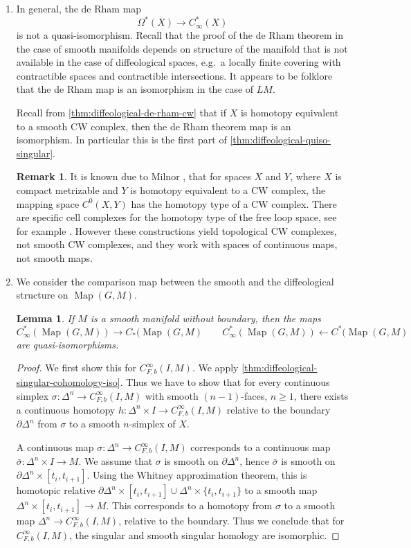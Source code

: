 \documentclass{scrartcl}
\theoremstyle{plain}
\newtheorem{lemma}[theorem]{Lemma}
\theoremstyle{definition}
\newtheorem{remark}[theorem]{Remark}
\newcommand{\from}{\leftarrow}
\DeclareMathOperator{\Map}{Map}
\begin{document}
\begin{enumerate}[(1)]
    \item In general, the de Rham map $$\Omega^*(X) \to C_\infty^*(X)$$ is not a quasi-isomorphism. Recall that the proof of the de Rham theorem in the case of smooth manifolds depends on structure of the manifold that is not available in the case of diffeological spaces, e.g.\ a locally finite covering with contractible spaces and contractible intersections. It appears to be folklore that the de Rham map is an isomorphism in the case of $LM$. 

Recall from \cref{thm:diffeological-de-rham-cw} that if $X$ is homotopy equivalent to a smooth CW complex, then the de Rham theorem map is an isomorphism. In particular this is the first part of \cref{thm:diffeological-quiso-singular}.

\begin{remark}
    It is known due to Milnor \cite{milnor1959spaces}, that for spaces $X$ and $Y$, where $X$ is compact metrizable and $Y$ is homotopy equivalent to a CW complex, the mapping space $C^0(X, Y)$ has the homotopy type of a CW complex. There are specific cell complexes for the homotopy type of the free loop space, see for example \cite{rivera2018combinatorial}. However these constructions yield topological CW complexes, not smooth CW complexes, and they work with spaces of continuous maps, not smooth maps.
\end{remark}

\item We consider the comparison map between the smooth and the diffeological structure on $\Map(G, M)$.
\begin{lemma}\label{lemma:comparison-singular-smooth-cohomology}
    If $M$ is a smooth manifold without boundary, then the maps 
    $$C_\infty^*(\Map(G, M)) \to C_*(\Map(G, M) \qquad C_\infty^*(\Map(G, M)) \from C^*(\Map(G, M)$$ are quasi-isomorphisms.
\end{lemma}
\begin{proof}
    We first show this for $C^\infty_{F, b}(I, M)$. We apply \cref{thm:diffeological-singular-cohomology-iso}. Thus we have to show that for every continuous simplex $\sigma\colon \Delta^n\to C^\infty_{F, b}(I, M)$ with smooth $(n-1)$-faces, $n\geq 1$, there exists a continuous homotopy $h\colon \Delta^n\times I\to C^\infty_{F, b}(I, M)$ relative to the boundary $\partial\Delta^n$ from $\sigma$ to a smooth $n$-simplex of $X$.

    A continuous map $\sigma\colon\Delta^n\to C^\infty_{F, b}(I, M)$ corresponds to a continuous map $\bar \sigma \colon \Delta^n\times I\to M$. We assume that $\sigma$ is smooth on $\partial\Delta^n$, hence $\bar \sigma$ is smooth on $\partial\Delta^n\times [t_i, t_{i+1}]$. Using the Whitney approximation theorem, this is homotopic relative $\partial\Delta^n\times [t_i, t_{i+1}]\cup \Delta^n\times \{t_i, t_{i+1}\}$ to a smooth map $\Delta^n\times [t_i, t_{i+1}]\to M$. This corresponds to a homotopy from $\sigma$ to a smooth map $\Delta^n\to C^\infty_{F, b}(I, M)$, relative to the boundary. Thus we conclude that for $C^\infty_{F, b}(I, M)$, the singular and smooth singular homology are isomorphic.


\end{proof}
\end{enumerate}
\end{document}
